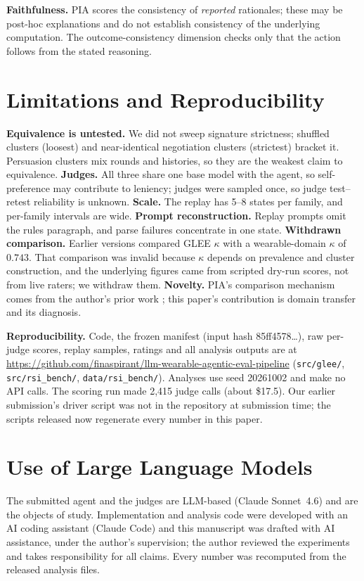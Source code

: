 \documentclass{article}
\begin{document}
\textbf{Faithfulness.} PIA scores the consistency of \emph{reported} rationales; these may be post-hoc explanations \citep{turpin2023,lanham2023} and do not establish consistency of the underlying computation. The outcome-consistency dimension checks only that the action follows from the stated reasoning.

\section{Limitations and Reproducibility}

\textbf{Equivalence is untested.} We did not sweep signature strictness; shuffled clusters (loosest) and near-identical negotiation clusters (strictest) bracket it. Persuasion clusters mix rounds and histories, so they are the weakest claim to equivalence. \textbf{Judges.} All three share one base model with the agent, so self-preference \citep{zheng2023,panickssery2024} may contribute to leniency; judges were sampled once, so judge test--retest reliability is unknown. \textbf{Scale.} The replay has 5--8 states per family, and per-family intervals are wide. \textbf{Prompt reconstruction.} Replay prompts omit the rules paragraph, and parse failures concentrate in one state. \textbf{Withdrawn comparison.} Earlier versions compared GLEE $\kappa$ with a wearable-domain $\kappa$ of $0.743$. That comparison was invalid because $\kappa$ depends on prevalence and cluster construction, and the underlying figures came from scripted dry-run scores, not from live raters; we withdraw them. \textbf{Novelty.} PIA's comparison mechanism comes from the author's prior work \citep{agenttrace}; this paper's contribution is domain transfer and its diagnosis.

\textbf{Reproducibility.} Code, the frozen manifest (input hash 85ff4578\ldots), raw per-judge scores, replay samples, ratings and all analysis outputs are at \url{https://github.com/finaspirant/llm-wearable-agentic-eval-pipeline} (\texttt{src/glee/}, \texttt{src/rsi\_bench/}, \texttt{data/rsi\_bench/}). Analyses use seed 20261002 and make no API calls. The scoring run made 2{,}415 judge calls (about \$17.5). Our earlier submission's driver script was not in the repository at submission time; the scripts released now regenerate every number in this paper.

\section*{Use of Large Language Models}
The submitted agent and the judges are LLM-based (Claude Sonnet~4.6) and are the objects of study. Implementation and analysis code were developed with an AI coding assistant (Claude Code) and this manuscript was drafted with AI assistance, under the author's supervision; the author reviewed the experiments and takes responsibility for all claims. Every number was recomputed from the released analysis files.
\end{document}
